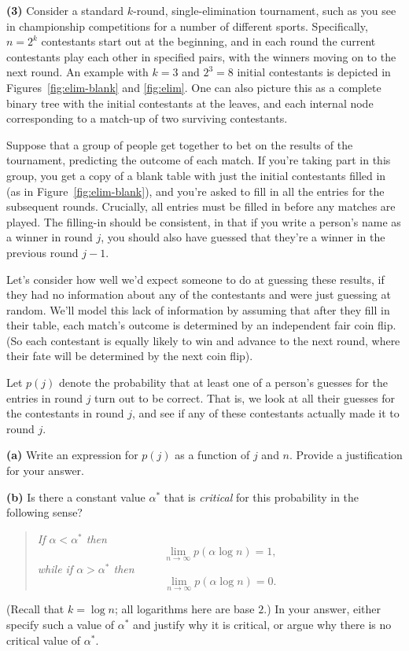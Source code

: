 \documentclass[12pt]{article}
\def\eps{{\varepsilon}}
\begin{document}
\scenebreak

{\bf (3)} 
Consider a standard $k$-round, single-elimination tournament,
such as you see in championship competitions for a number of different sports.
Specifically, $n = 2^k$ contestants start out at the beginning,
and in each round the current contestants play each other in specified pairs,
with the winners moving on to the next round.
An example with $k = 3$ and $2^3 = 8$ initial contestants
is depicted in Figures~\ref{fig:elim-blank} and \ref{fig:elim}.
One can also picture this as a complete binary tree with
the initial contestants at the leaves, and each internal node
corresponding to a match-up of two surviving contestants.

Suppose that a group of people get together to bet on the results
of the tournament, predicting the outcome of each match.
If you're taking part in this group, you get
a copy of a blank table with
just the initial contestants filled in
(as in Figure~\ref{fig:elim-blank}),
and you're asked to fill in all the entries for the subsequent rounds.
Crucially, all entries must be filled in before 
any matches are played.
The filling-in should be consistent, in that if you
write a person's name as a winner in round $j$,
you should also have guessed that they're a winner 
in the previous round $j-1$.

Let's consider how well we'd expect someone to do 
at guessing these results, if they had no information about
any of the contestants and were just guessing at random.
We'll model this lack of information by assuming that
after they fill in their table, 
each match's outcome is 
determined by an independent fair coin flip.  (So each contestant
is equally likely to win and advance to the next round,
where their fate will be determined by the next coin flip).

Let $p(j)$ denote the probability that at least one of 
a person's guesses for the entries in
round $j$ turn out to be correct.
That is, we look at all their guesses for the contestants
in round $j$, and see if any of these contestants 
actually made it to round $j$.

\gap

{\bf (a)}
Write an expression for $p(j)$ as a function of $j$ and $n$.
Provide a justification for your answer.

\gap
\gap

{\bf (b)}
Is there a constant value $\alpha^*$ that is {\em critical} for
this probability 
in the following sense?
\begin{quote}
{\em If $\alpha < \alpha^*$ then 
$$\lim_{n \rightarrow \infty} p(\alpha \log n) = 1,$$
while if 
$\alpha > \alpha^*$ then 
$$\lim_{n \rightarrow \infty} p(\alpha \log n) = 0.$$}
\end{quote}
(Recall that $k = \log n$; all logarithms here are base $2$.)
In your answer, either specify such a value of $\alpha^*$ and
justify why it is critical, or argue why there is no
critical value of $\alpha^*$.

\end{document}
